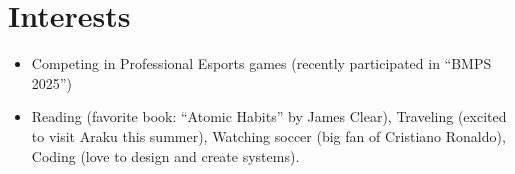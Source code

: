 \documentclass[letterpaper,11pt]{article}
\makeatletter
\newcommand{\resumeItem}[2]{
  \item\small{
    \textbf{#1}{ #2 \vspace{-2pt}}
  }
}
\newcommand{\resumeSubheading}[4]{
  \vspace{-1pt}\item
    \begin{tabular*}{0.97\textwidth}{l@{\extracolsep{\fill}}r}
      \textbf{#1} & #2 \\
      \textit{\small#3} & \textit{\small #4} \\
    \end{tabular*}\vspace{-5pt}
}
\newcommand{\resumeSubItem}[2]{\resumeItem{#1}{#2}\vspace{-4pt}}
\newcommand{\resumeSubHeadingListStart}{\begin{itemize}[leftmargin=*]}
\newcommand{\resumeSubHeadingListEnd}{\end{itemize}}
\newcommand{\resumeItemListStart}{\begin{itemize}}
\newcommand{\resumeItemListEnd}{\end{itemize}\vspace{-5pt}}
\makeatother
\begin{document}
\section{Interests}
\resumeSubHeadingListStart
  \resumeSubItem{}{Competing in Professional Esports games (recently participated in “BMPS 2025”) }
  \resumeSubItem{}{Reading (favorite book: “Atomic Habits” by James Clear), Traveling (excited to visit Araku this summer), Watching soccer (big fan of Cristiano Ronaldo), Coding (love to design and create systems).}
\resumeSubHeadingListEnd





\end{document}
